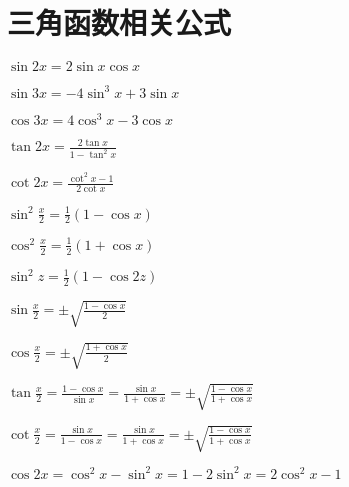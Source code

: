 \section{三角函数相关公式}

\begin{spacing}{\hangju}
    \begin{multicols}{2}
        \noindent $\sin{2x}=2\sin{x}\cos{x}$

        \noindent $\sin{3x}=-4\sin^3{x}+3\sin{x}$

        \noindent $\cos{3x}=4\cos^3{x}-3\cos{x}$

        \noindent $\tan{2x}=\frac{2\tan{x}}{1-\tan^2{x}}$

        \noindent $\cot{2x}=\frac{\cot^2{x}-1}{2\cot{x}}$

        \noindent $\sin^2{\frac{x}{2}}=\frac{1}{2}(1-\cos{x})$

        \noindent $\cos^2{\frac{x}{2}}=\frac{1}{2}(1+\cos{x})$

        \noindent $\sin^2{z}=\frac{1}{2}(1-\cos{2z})$

        \noindent $\sin{\frac{x}{2}}=\pm\sqrt{\frac{1-\cos{x}}{2}}$

        \noindent $\cos{\frac{x}{2}}=\pm\sqrt{\frac{1+\cos{x}}{2}}$

    \end{multicols}

    \noindent $\tan{\frac{x}{2}}=\frac{1-\cos{x}}{\sin{x}}=\frac{\sin{x}}{1+\cos{x}}=\pm\sqrt{\frac{1-\cos{x}}{1+\cos{x}}}$

    \noindent $\cot{\frac{x}{2}}=\frac{\sin{x}}{1-\cos{x}}=\frac{\sin{x}}{1+\cos{x}}=\pm\sqrt{\frac{1-\cos{x}}{1+\cos{x}}}$

    \noindent $\cos{2x}=\cos^2{x}-\sin^2{x}=1-2\sin^2{x}=2\cos^2{x}-1$
\end{spacing}